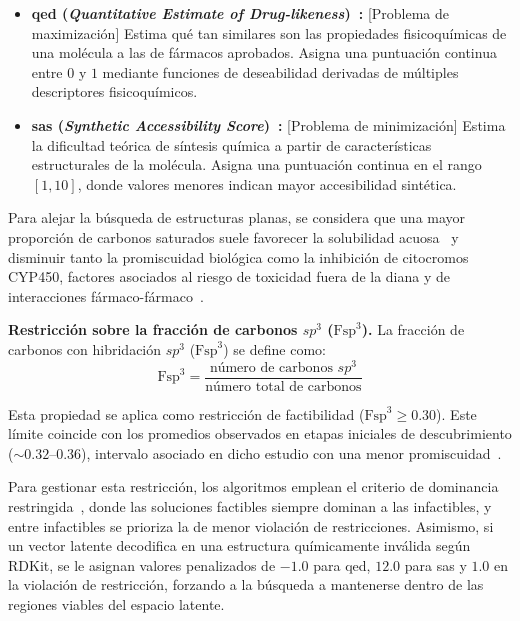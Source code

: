 \begin{itemize}
    \item \textbf{\gls{qed} (\textit{Quantitative Estimate of Drug-likeness})~\cite{Bickerton2012QED}:} [Problema de maximización] Estima qué tan similares son las propiedades fisicoquímicas de una molécula a las de fármacos aprobados. Asigna una puntuación continua entre $0$ y $1$ mediante funciones de deseabilidad derivadas de múltiples descriptores fisicoquímicos.
    \item \textbf{\gls{sas} (\textit{Synthetic Accessibility Score})~\cite{Ertl2009SAScore}:} [Problema de minimización] Estima la dificultad teórica de síntesis química a partir de características estructurales de la molécula. Asigna una puntuación continua en el rango $[1, 10]$, donde valores menores indican mayor accesibilidad sintética.
\end{itemize}

Para alejar la búsqueda de estructuras planas, se considera que una mayor proporción de carbonos saturados suele favorecer la solubilidad acuosa~\cite{Lovering2009Flatland} y disminuir tanto la promiscuidad biológica como la inhibición de citocromos CYP450, factores asociados al riesgo de toxicidad fuera de la diana y de interacciones fármaco-fármaco~\cite{Lovering2013Flatland2}.

\textbf{Restricción sobre la fracción de carbonos $sp^3$ ($\text{Fsp}^3$).} La fracción de carbonos con hibridación $sp^3$ ($\text{Fsp}^3$) se define como:
\begin{equation}
    \text{Fsp}^3 = \frac{\text{número de carbonos } sp^3}{\text{número total de carbonos}}
\end{equation}

Esta propiedad se aplica como restricción de factibilidad ($\text{Fsp}^3 \ge 0.30$). Este límite coincide con los promedios observados en etapas iniciales de descubrimiento ($\sim 0.32\text{--}0.36$), intervalo asociado en dicho estudio con una menor promiscuidad~\cite{Lovering2013Flatland2}.

Para gestionar esta restricción, los algoritmos emplean el criterio de dominancia restringida~\cite{deb2002nsga2}, donde las soluciones factibles siempre dominan a las infactibles, y entre infactibles se prioriza la de menor violación de restricciones. Asimismo, si un vector latente decodifica en una estructura químicamente inválida según RDKit, se le asignan valores penalizados de $-1.0$ para \gls{qed}, $12.0$ para \gls{sas} y $1.0$ en la violación de restricción, forzando a la búsqueda a mantenerse dentro de las regiones viables del espacio latente.

